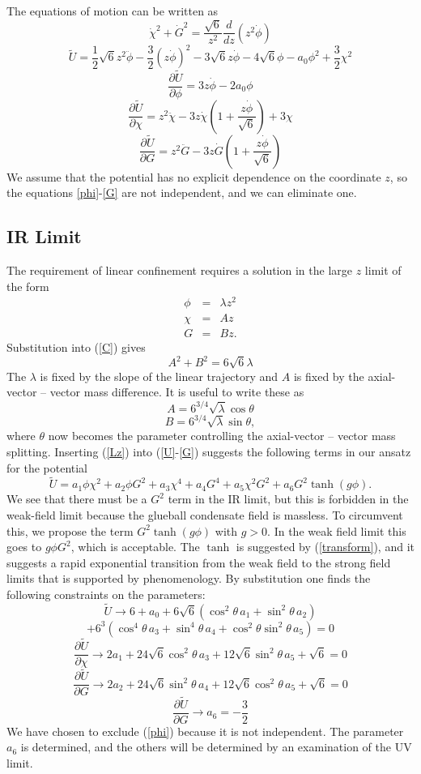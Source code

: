 \documentclass[12pt]{article}
\newcommand{\be}{\begin{equation}}
\newcommand{\ee}{\end{equation}}
\newcommand{\ba}{\begin{eqnarray}}
\newcommand{\ea}{\end{eqnarray}}
\newcommand{\bd}{\begin{displaymath}}
\newcommand{\ed}{\end{displaymath}}
\def\thalf{{\textstyle{\frac{1}{2}}}}
\def\tthalf{{\textstyle{\frac{3}{2}}}}
\def\Dz{\frac{d}{dz}}
\def\phidot{\dot{\phi}}
\def\phiddot{\ddot{\phi}}
\def\chidot{\dot{\chi}}
\def\chiddot{\ddot{\chi}}
\def\Gdot{\dot{G}}
\def\Gddot{\ddot{G}}
\def\rt6{\sqrt{6}}
\begin{document}
The equations of motion can be written as
\be
\chidot^2 + \Gdot^2 = \frac{\rt6}{z^2} \Dz(z^2\phidot)
\label{C}
\ee
\be
\tilde{U}=\thalf \rt6 z^2 \phiddot - \tthalf (z\phidot)^2 - 3 \rt6 z\phidot 
-4\sqrt{6}\phi - a_0\phi^2 +\tthalf\chi^2
\label{U}
\ee
\be
 \frac{\partial \tilde{U}}{\partial \phi}=3z\phidot - 2a_0\phi
\label{phi}
\ee
\be
 \frac{\partial \tilde{U}}{\partial \chi}
=z^2\chiddot -3z\chidot \left(1+\frac{z\phidot}{\rt6} \right) + 3\chi
\label{chi}
\ee
\be
 \frac{\partial \tilde{U}}{\partial G}=
z^2\Gddot -3z\Gdot \left(1+\frac{z\phidot}{\rt6} \right)
\label{G}
\ee
We assume that the potential has no explicit dependence on the coordinate $z$,  so the equations \ref{phi}-\ref{G} are not independent, and we can eliminate one. 

\subsection{IR Limit}
The requirement of linear confinement requires a solution in the large $z$ limit of the  form
\ba
\phi &=& \lambda z^2 \\
\chi &=& Az \\
G &=& B z.
\label{Lz}
\ea
Substitution into (\ref{C}) gives
\be
A^2 + B^2 = 6\rt6 \lambda
\label{Clarge}
\ee
The $\lambda$ is fixed by the slope of the linear trajectory and $A$ is fixed by the axial-vector -- vector mass difference.  
It is useful to write these as
\bd
A = 6^{3/4} \sqrt{\lambda} \cos\theta
\ed
\be
B = 6^{3/4} \sqrt{\lambda} \sin\theta,
\ee
where $\theta$ now becomes the parameter controlling the axial-vector -- vector mass splitting.
Inserting (\ref{Lz}) into (\ref{U}-\ref{G}) suggests the following terms in our ansatz for the potential
\be
\tilde{U} =  a_1 \phi \chi^2 + a_2 \phi G^2 + a_3 \chi^4 + a_4 G^4 + a_5 \chi^2 G^2 
+ a_6 G^2 \tanh(g\phi).
\ee
We see that there must be a $G^2$ term in the IR limit, but this is forbidden in the weak-field limit because the glueball condensate field is massless. 
To circumvent this, we propose the term $G^2 \tanh(g\phi)$ with $g>0$.  
In the weak field limit this goes to $g\phi G^2$, which is acceptable.  
The $\tanh$ is suggested by (\ref{transform}), and it suggests a rapid exponential transition from the weak field to the strong field limits that is supported by phenomenology.
By substitution one finds the following constraints on the parameters:
\bd
\tilde{U} \rightarrow 6 + a_0 + 6\rt6 \left( \cos^2 \theta \, a_1 + \sin^2 \theta \, a_2 \right)
\ed
\be
+ 6^3 \left( \cos^4 \theta \, a_3 + \sin^4 \theta \, a_4 + \cos^2 \theta \sin^2 \theta \, a_5 \right) = 0
\ee
\be
\frac{\partial \tilde{U}}{\partial \chi} \rightarrow
2a_1 + 24\rt6 \cos^2\theta \, a_3 + 12\rt6 \sin^2\theta \, a_5 + \rt6 = 0
\ee
\be
\frac{\partial \tilde{U}}{\partial G} \rightarrow
2a_2 + 24\rt6 \sin^2\theta \, a_4 + 12\rt6 \cos^2\theta \, a_5 + \rt6 = 0
\ee
\be
\frac{\partial \tilde{U}}{\partial G} \rightarrow
a_6 = - \tthalf \label{LargeZ2}
\ee
We have chosen to exclude (\ref{phi}) because it is not independent. 
The parameter $a_6$ is determined, and the others will be determined by an examination of the UV limit.
\end{document}
